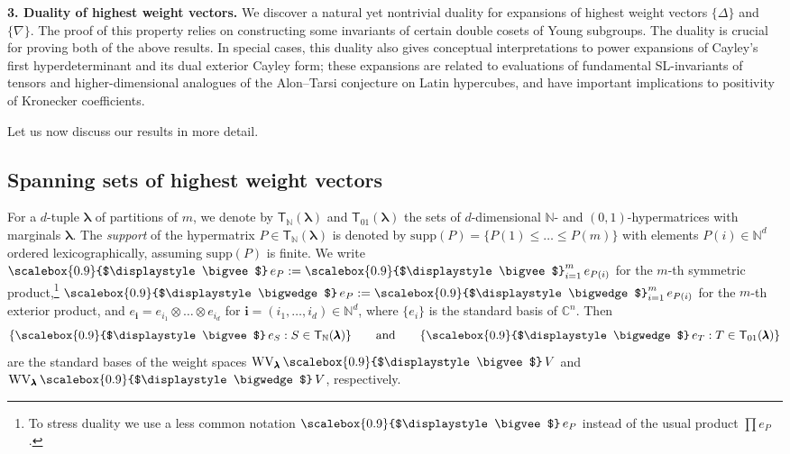 \documentclass[12pt, reqno]{amsart}
\theoremstyle{definition}
\let\oldbigwedge\bigwedge
\let\oldbigvee\bigvee
\renewcommand{\bigwedge}{
  \mathop{
    \vcenter{
      \hbox{\scalebox{0.9}{$\displaystyle\oldbigwedge$}}
    }
  }
}
\renewcommand{\bigvee}{
  \mathop{
    \vcenter{
      \hbox{\scalebox{0.9}{$\displaystyle\oldbigvee$}}
    }
  }
}
\begin{document}
{\bf 3. Duality of highest weight vectors.} 
We discover a natural yet nontrivial duality for expansions of highest weight vectors $\{\Delta \}$ and $\{ \nabla \}$. 
The proof of this property relies on constructing some invariants of certain double cosets of Young subgroups. 
The duality is crucial for proving both of the above results. 
In special cases, this duality also gives conceptual interpretations to power expansions of Cayley's first hyperdeterminant and its dual exterior Cayley form; these expansions are related to evaluations of fundamental SL-invariants of tensors and higher-dimensional analogues of the Alon--Tarsi conjecture on Latin hypercubes, and have important implications to positivity of Kronecker coefficients. %

\vspace{0.5em}

Let us now discuss our results in more detail. 

\subsection*{Spanning sets of highest weight vectors} %
For a $d$-tuple $\pmb{\lambda}$ of partitions of $m$, we denote by $\mathsf{T}_{\mathbb{N}}(\pmb{\lambda})$ and $\mathsf{T}_{01}(\pmb{\lambda})$ the sets of $d$-dimensional $\mathbb{N}$- and $(0,1)$-hypermatrices with marginals $\pmb{\lambda}$. The \textit{support} of the hypermatrix $P \in \mathsf{T}_\mathbb{N}(\pmb{\lambda})$ is denoted by $\mathrm{supp}(P) = \{P(1) \le \ldots \le P(m) \}$ with elements $P(i) \in \mathbb{N}^d$ ordered lexicographically, assuming $\mathrm{supp}(P)$ is finite. We write $\bigvee e_P := \bigvee_{i=1}^m e_{P(i)}$ for the $m$-th symmetric product,\footnote{To stress duality we use a less common notation $\bigvee e_P$ instead of the usual product $\prod e_P$. } 
$\bigwedge e_P := \bigwedge_{i=1}^m e_{P(i)}$ for the $m$-th exterior product, and $e_{\mathbf{i}} = e_{i_1} \otimes \ldots \otimes e_{i_d}$ for $\mathbf{i} = (i_1,\ldots, i_d) \in \mathbb{N}^d$, where $\{e_i \}$ is the standard basis of $\mathbb{C}^n$. Then 
\begin{align}\label{eq:intro-wv}
    \{\bigvee e_{S} : S \in \mathsf{T}_{\mathbb{N}}(\pmb{\lambda}) \}\qquad\text{and}\qquad\{\bigwedge e_{T} : T \in \mathsf{T}_{01}(\pmb{\lambda}) \}
\end{align}
are the standard bases of the weight spaces $\mathrm{WV}_{\pmb{\lambda}} \bigvee V$ and $\mathrm{WV}_{\pmb{\lambda}} \bigwedge V$, respectively. 
\end{document}
